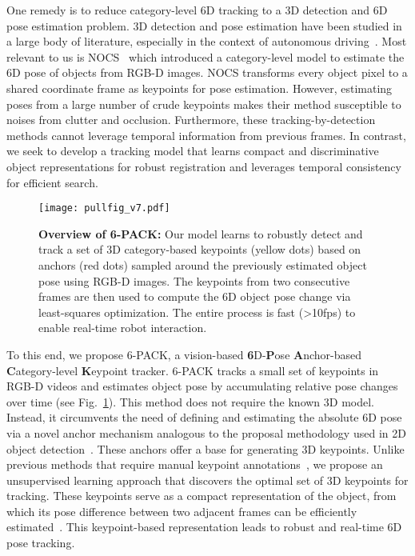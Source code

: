 \documentclass[letterpaper, 10 pt, conference]{ieeeconf}
\newcommand{\methodname}{\textsc{6-PACK}\xspace}
\begin{document}
One remedy is to reduce category-level 6D tracking to a 3D detection and 6D pose estimation problem. 3D detection and pose estimation have been studied in a large body of literature, especially in the context of autonomous driving~\cite{qi2018frustum,xu2017pointfusion}. Most relevant to us is NOCS~\cite{wang2019normalized} which introduced a category-level model to estimate the 6D pose of objects from RGB-D images. NOCS transforms every object pixel to a shared coordinate frame as keypoints for pose estimation. However, estimating poses from a large number of crude keypoints makes their method susceptible to noises from clutter and occlusion. Furthermore, these tracking-by-detection methods cannot leverage temporal information from previous frames. In contrast, we seek to develop a tracking model that learns compact and discriminative object representations for robust registration and leverages temporal consistency for efficient search.


\begin{figure}[t]
    \center
    \texttt{[image: pullfig\_v7.pdf]}
    \vspace{-2mm}
    \caption{\textbf{Overview of \methodname{}:} Our model learns to robustly detect and track a set of 3D category-based keypoints (yellow dots) based on anchors (red dots) sampled around the previously estimated object pose using RGB-D images. The keypoints from two consecutive frames are then used to compute the 6D object pose change via least-squares optimization. The entire process is fast (\textgreater10fps) to enable real-time robot interaction.}
    \vspace{-5mm}
    \label{fig:pullfig}
\end{figure}

To this end, we propose \methodname, a vision-based \textbf{6}D-\textbf{P}ose \textbf{A}nchor-based \textbf{C}ategory-level \textbf{K}eypoint tracker. \methodname tracks a small set of keypoints in RGB-D videos and estimates object pose by accumulating relative pose changes over time (see Fig.~\ref{fig:pullfig}). This method does not require the known 3D model. Instead, it circumvents the need of defining and estimating the absolute 6D pose via a novel anchor mechanism analogous to the proposal methodology used in 2D object detection~\cite{ren2015faster}. These anchors offer a base for generating 3D keypoints. Unlike previous methods that require manual keypoint annotations~\cite{manuelli2019kpam}, we propose an unsupervised learning approach that discovers the optimal set of 3D keypoints for tracking. These keypoints serve as a compact representation of the object, from which its pose difference between two adjacent frames can be efficiently estimated~\cite{arun1987least}. This keypoint-based representation leads to robust and real-time 6D pose tracking.
\end{document}
